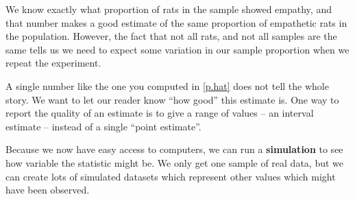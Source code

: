   We know exactly what proportion of rats in the sample showed
  empathy, and that number makes a good estimate of the same
  proportion of empathetic rats in the population.  However, the fact
  that not all rats, and not all samples are the same tells us we need
  to expect some variation in our sample proportion when we repeat the
  experiment. 

  A single number like the one you computed in
  \ref{p.hat} does not tell the whole story.  We want to let our
  reader know ``how good'' this estimate is.  One way to report the
  quality of an estimate is to give a range of values -- an interval
  estimate --  instead of a  single ``point estimate''.  

  Because we now have easy access to computers, we can run a {\bf
    simulation} to see how variable the statistic might be.  We only
  get one sample of real data, but we can create lots of simulated
  datasets which represent other values which might have been observed.

